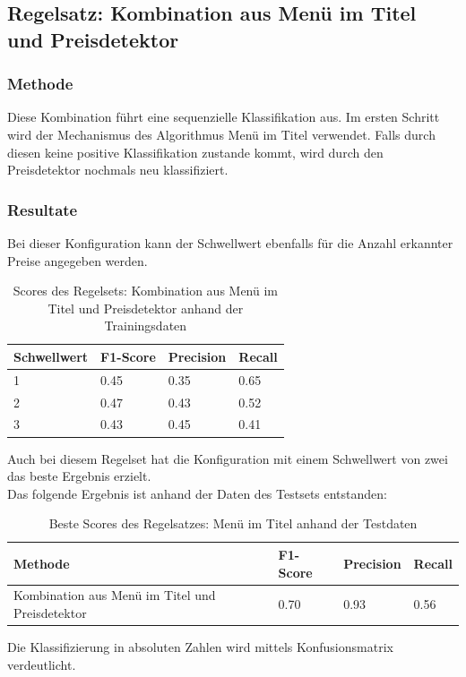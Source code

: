 \subsection{Regelsatz: Kombination aus Menü im Titel und Preisdetektor}
\subsubsection{Methode}
Diese Kombination führt eine sequenzielle Klassifikation aus.
Im ersten Schritt wird der Mechanismus des Algorithmus \glqq Menü im Titel\grqq{} verwendet.
Falls durch diesen keine positive Klassifikation zustande kommt, wird durch den Preisdetektor nochmals neu klassifiziert.
\subsubsection{Resultate}
Bei dieser Konfiguration kann der Schwellwert ebenfalls für die Anzahl erkannter Preise angegeben werden.\\
\begin{table}[H]
	\caption{Scores des Regelsets: Kombination aus Menü im Titel und Preisdetektor anhand der Trainingsdaten}
	\centering
	\begin{tabular}{|l|l|l|l|}
		\hline
		Schwellwert & F1-Score & Precision & Recall\\
		\hline
		1 & 0.45 & 0.35 & 0.65 \\
		2 & 0.47 & 0.43 & 0.52 \\
		3 & 0.43 & 0.45 & 0.41 \\
		\hline
	\end{tabular}
\end{table}
Auch bei diesem Regelset hat die Konfiguration mit einem Schwellwert von zwei das beste Ergebnis erzielt.
\\
Das folgende Ergebnis ist anhand der Daten des Testsets entstanden:
\begin{table}[H]
	\caption{Beste Scores des Regelsatzes: Menü im Titel anhand der Testdaten}
	\centering
	\begin{tabular}{|l|l|l|l|}
		\hline
		Methode & F1-Score & Precision & Recall\\
		\hline
		Kombination aus Menü im Titel und Preisdetektor & 0.70 & 0.93 & 0.56\\
		\hline
	\end{tabular}
\end{table}
Die Klassifizierung in absoluten Zahlen wird mittels Konfusionsmatrix verdeutlicht.
